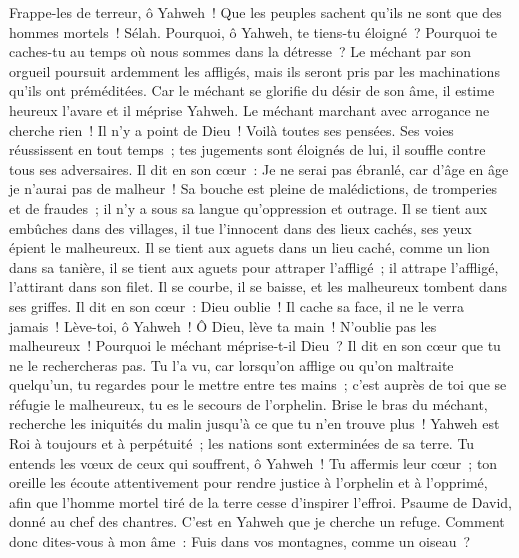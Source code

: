 \begin{multicols}{2}
Frappe-les de terreur, ô Yahweh~! Que les peuples sachent qu'ils ne sont que des hommes mortels~! Sélah.
\VerseOne{}Pourquoi, ô Yahweh, te tiens-tu éloigné~? Pourquoi te caches-tu au temps où nous sommes dans la détresse~?
Le méchant par son orgueil poursuit ardemment les affligés, mais ils seront pris par les machinations qu'ils ont préméditées.
Car le méchant se glorifie du désir de son âme, il estime heureux l'avare et il méprise Yahweh.
Le méchant marchant avec arrogance ne cherche rien~! Il n'y a point de Dieu~! Voilà toutes ses pensées.
Ses voies réussissent en tout temps~; tes jugements sont éloignés de lui, il souffle contre tous ses adversaires.
Il dit en son cœur~: Je ne serai pas ébranlé, car d'âge en âge je n'aurai pas de malheur~!
Sa bouche est pleine de malédictions, de tromperies et de fraudes~; il n'y a sous sa langue qu'oppression et outrage.
Il se tient aux embûches dans des villages, il tue l'innocent dans des lieux cachés, ses yeux épient le malheureux.
Il se tient aux aguets dans un lieu caché, comme un lion dans sa tanière, il se tient aux aguets pour attraper l'affligé~; il attrape l'affligé, l'attirant dans son filet.
Il se courbe, il se baisse, et les malheureux tombent dans ses griffes.
Il dit en son cœur~: Dieu oublie~! Il cache sa face, il ne le verra jamais~!
Lève-toi, ô Yahweh~! Ô Dieu, lève ta main~! N'oublie pas les malheureux~!
Pourquoi le méchant méprise-t-il Dieu~? Il dit en son cœur que tu ne le rechercheras pas.
Tu l'a vu, car lorsqu'on afflige ou qu'on maltraite quelqu'un, tu regardes pour le mettre entre tes mains~; c'est auprès de toi que se réfugie le malheureux, tu es le secours de l'orphelin.
Brise le bras du méchant, recherche les iniquités du malin jusqu'à ce que tu n'en trouve plus~!
Yahweh est Roi à toujours et à perpétuité~; les nations sont exterminées de sa terre.
Tu entends les vœux de ceux qui souffrent, ô Yahweh~! Tu affermis leur cœur~; ton oreille les écoute attentivement
pour rendre justice à l'orphelin et à l'opprimé, afin que l'homme mortel tiré de la terre cesse d'inspirer l'effroi.
\VerseOne{}Psaume de David, donné au chef des chantres. C'est en Yahweh que je cherche un refuge. Comment donc dites-vous à mon âme~: Fuis dans vos montagnes, comme un oiseau~?

\end{multicols}
